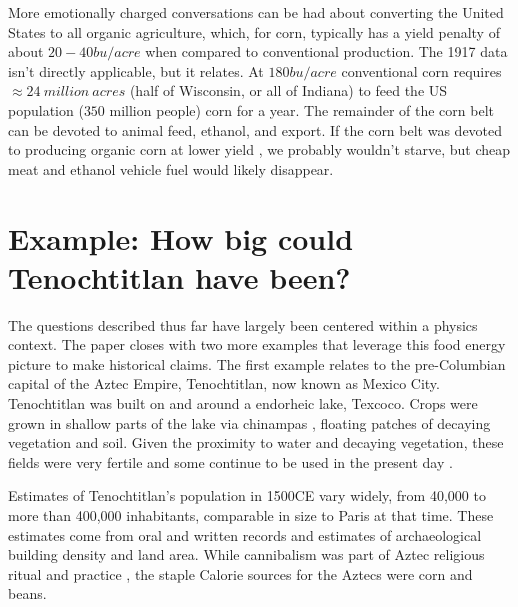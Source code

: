\documentclass[12pt]{iopart}
\begin{document}
%
%
More emotionally charged conversations can be had about converting the United States to all organic agriculture, which, for corn, typically has a yield penalty of about $20-40bu/acre$ when compared to conventional production.  The 1917 data isn't directly applicable, but it relates. At $180bu/acre$ conventional corn requires $\approx 24~million~acres$ (half of Wisconsin, or all of Indiana) to feed the US population ($350$ million people) corn for a year.  The remainder of the corn belt can be devoted to animal feed, ethanol, and export.  If the corn belt was devoted to producing organic corn at lower yield \cite{organic_corn_yield}, we probably wouldn't starve, but cheap meat and ethanol vehicle fuel would likely disappear.   
%

\clearpage

\section{Example: How big could Tenochtitlan have been?}
The questions described thus far have largely been centered within a physics context.  The paper closes with two more examples that leverage this food energy picture to make historical claims.  The first example relates to the pre-Columbian capital of the Aztec Empire, Tenochtitlan, now known as Mexico City.  Tenochtitlan was built on and around a endorheic lake, Texcoco.  Crops were grown in shallow parts of the lake via chinampas \cite{national_geo}, floating patches of decaying vegetation and soil.  Given the proximity to water and decaying vegetation, these fields were very fertile \cite{HortTech_2019,Chinampas_1964} and some continue to be used in the present day \cite{google_earth}.  


Estimates of Tenochtitlan's population in 1500CE vary widely, from 40,000 \cite{40k} to more than 400,000 \cite{400k} inhabitants, comparable in size to Paris at that time. These estimates come from oral and written records and estimates of archaeological building density and land area.   While cannibalism was part of Aztec religious ritual and practice \cite{Aztec_Cannibalism}, the staple Calorie sources for the Aztecs were corn and beans.
\end{document}
